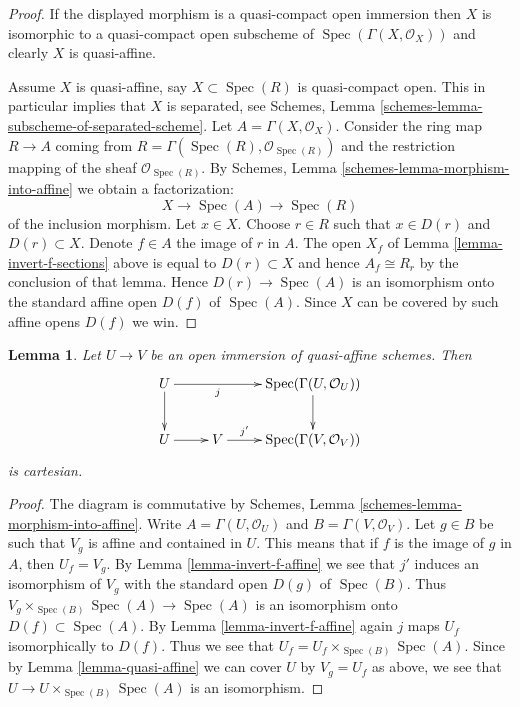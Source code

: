 \documentclass{stacks-project}
\theoremstyle{plain}
\newtheorem{lemma}[subsection]{Lemma}
\theoremstyle{definition}
\theoremstyle{remark}
\numberwithin{equation}{subsection}
\def\Spec{\mathop{\mathrm{Spec}}}
\begin{document}
\begin{proof}
If the displayed morphism is a quasi-compact open immersion then
$X$ is isomorphic to a quasi-compact open subscheme of
$\Spec(\Gamma(X, \mathcal{O}_X))$ and clearly $X$ is quasi-affine.

\medskip\noindent
Assume $X$ is quasi-affine, say $X \subset \Spec(R)$ is
quasi-compact open. This in particular implies that $X$ is
separated, see
Schemes, Lemma \ref{schemes-lemma-subscheme-of-separated-scheme}.
Let $A = \Gamma(X, \mathcal{O}_X)$.
Consider the ring map $R \to A$ coming from
$R = \Gamma(\Spec(R), \mathcal{O}_{\Spec(R)})$
and the restriction mapping of the sheaf $\mathcal{O}_{\Spec(R)}$.
By Schemes, Lemma \ref{schemes-lemma-morphism-into-affine}
we obtain a factorization:
$$
X \longrightarrow
\Spec(A) \longrightarrow
\Spec(R)
$$
of the inclusion morphism. Let $x \in X$. Choose $r \in R$ such that
$x \in D(r)$ and $D(r) \subset X$. Denote $f \in A$ the image of $r$
in $A$. The open $X_f$ of Lemma \ref{lemma-invert-f-sections}
above is equal to $D(r) \subset X$ and hence $A_f \cong R_r$ by the
conclusion of that lemma.
Hence $D(r) \to \Spec(A)$ is an isomorphism onto the
standard affine open $D(f)$ of $\Spec(A)$. Since $X$
can be covered by such affine opens $D(f)$ we win.
\end{proof}

\begin{lemma}
\label{lemma-cartesian-diagram-quasi-affine}
Let $U \to V$ be an open immersion of quasi-affine schemes. Then
$$
\xymatrix{
U \ar[d] \ar[rr]_-j & & \Spec(\Gamma(U, \mathcal{O}_U)) \ar[d] \\
U \ar[r] & V \ar[r]^-{j'} & \Spec(\Gamma(V, \mathcal{O}_V))
}
$$
is cartesian.
\end{lemma}

\begin{proof}
The diagram is commutative by Schemes, Lemma
\ref{schemes-lemma-morphism-into-affine}.
Write $A = \Gamma(U, \mathcal{O}_U)$ and $B = \Gamma(V, \mathcal{O}_V)$. Let
$g \in B$ be such that $V_g$ is affine and contained in $U$. This
means that if $f$ is the image of $g$ in $A$, then $U_f = V_g$. By Lemma
\ref{lemma-invert-f-affine} we see that $j'$ induces an isomorphism of
$V_g$ with the standard open $D(g)$ of $\Spec(B)$. Thus
$V_g \times_{\Spec(B)} \Spec(A) \to \Spec(A)$ is an
isomorphism onto $D(f) \subset \Spec(A)$. By Lemma \ref{lemma-invert-f-affine}
again $j$ maps $U_f$ isomorphically to $D(f)$. Thus we see that
$U_f = U_f \times_{\Spec(B)} \Spec(A)$. Since by
Lemma \ref{lemma-quasi-affine} we can cover $U$ by $V_g = U_f$ as above,
we see that $U \to U \times_{\Spec(B)} \Spec(A)$ is an isomorphism.
\end{proof}
\end{document}
